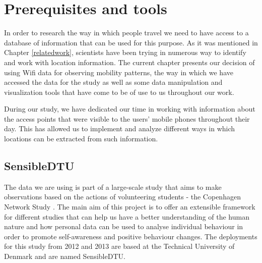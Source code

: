 \chapter{Prerequisites and tools}
In order to research the way in which people travel we need to have access to a
database of information that can be used for this purpose. As it was mentioned
in Chapter \ref{relatedwork}, scientists have been trying in numerous way to
identify and work with location information. The current chapter presents our
decision of using Wifi data for observing mobility patterns, the way in which we
have accessed the data for the study as well as some data manipulation and
visualization tools that have come to be of use to us throughout our work.

During our study, we have dedicated our time in working with information about
the access points that were visible to the users' mobile phones throughout their
day. This has allowed us to implement and analyze different ways in which
locations can be extracted from such information.

\section{SensibleDTU}
\label{sensible_dtu}

The data we are using is part of a large-scale study that aims to make
observations based on the actions of volunteering students - the Copenhagen
Network Study \cite{Stopczynski14m}. The main aim of this project is to offer an
extensible framework for different studies that can help us have a better
understanding of the human nature and how personal data can be used to analyse
individual behaviour in order to promote self-awareness and positive behaviour
changes. The deployments for this study from 2012 and 2013 are based at the
Technical University of Denmark and are named SensibleDTU.

